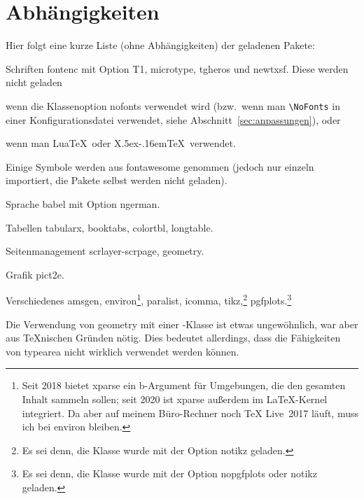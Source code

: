 \documentclass[hyperworksheet]{drcschool}
\newcommand*{\pkg}[1]{\textup{\ttfamily#1}}                                %
\newcommand*{\opt}[1]{\textup{\ttfamily#1}}                                %
\begin{document}
\section{Abhängigkeiten}
Hier folgt eine kurze Liste (ohne Abhängigkeiten) der geladenen Pakete:\par\medskip\noindent
\begin{compactdesc}
\item[Schriften] \pkg{fontenc} mit Option \opt{T1}, \pkg{microtype}, \pkg{tgheros} und \pkg{newtxsf}.
   Diese werden nicht geladen
   \begin{compactitem}
   \item wenn die Klassenoption \opt{nofonts} verwendet wird (bzw.~wenn man
   \verb=\NoFonts= in einer Konfigurationsdatei verwendet, siehe
   Abschnitt~\ref{sec:anpassungen}), oder
   \item wenn man Lua\TeX\ oder X\lower.5ex\hbox{}\kern-.16em\TeX\
         verwendet.
   \end{compactitem}
   Einige Symbole werden aus \pkg{fontawesome} genommen
   (jedoch nur einzeln importiert, die Pakete selbst werden nicht geladen).
\item[Sprache] \pkg{babel} mit Option \opt{ngerman}.
\item[Tabellen] \pkg{tabularx}, \pkg{booktabs}, \pkg{colortbl}, \pkg{longtable}.
\item[Seitenmanagement] \pkg{scrlayer-scrpage}, \pkg{geometry}.
\item[Grafik] \pkg{pict2e}.
\item[Verschiedenes] \pkg{amsgen}, \pkg{environ}\footnote{%
   Seit 2018 bietet \pkg{xparse} ein \opt{b}-Argument für Umgebungen, die den gesamten Inhalt
   sammeln sollen; seit 2020 ist \pkg{xparse} außerdem im \LaTeX-Kernel integriert. Da aber
   auf meinem Büro-Rechner noch TeX Live~2017 läuft, muss ich bei \pkg{environ} bleiben.},
   \pkg{paralist}, \pkg{icomma}, \pkg{tikz},\footnote{Es sei denn, die Klasse wurde mit der Option \opt{notikz} geladen.}
    \pkg{pgfplots}.\footnote{Es sei denn, die Klasse wurde mit der Option \opt{nopgfplots} oder \opt{notikz} geladen.}
\end{compactdesc}
Die Verwendung von \pkg{geometry} mit einer \KOMAScript-Klasse ist etwas
ungewöhnlich, war aber aus \TeX nischen Gründen nötig. Dies bedeutet allerdings,
dass die Fähigkeiten von \pkg{typearea} nicht wirklich verwendet werden können.
\end{document}
